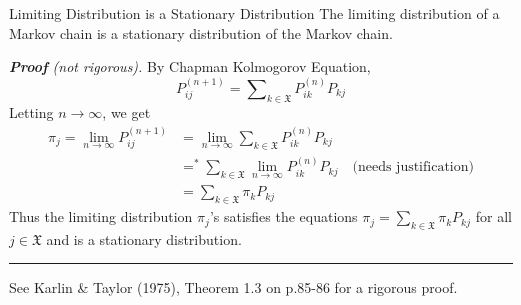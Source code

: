 \documentclass[letterpaper,handout]{beamer}
\def\P{\mathbb{P}}
\def\Sum{\sum\nolimits}
\def\X{\mathfrak{X}}
\begin{document}
%
%
%

\begin{frame}{Limiting Distribution is a Stationary Distribution}
The limiting distribution of a Markov chain is a stationary distribution of the Markov chain.\medskip

{\em \textbf{Proof} (not rigorous).} By Chapman Kolmogorov Equation,
$$P^{(n+1)}_{ij}=\Sum_{k\in\X}P^{(n)}_{ik}P_{kj}$$
Letting $n\to\infty$, we get
\begin{align*}
\pi_j=\lim_{n\to\infty}P^{(n+1)}_{ij}&=\lim_{n\to\infty}\Sum_{k\in\X}P^{(n)}_{ik}P_{kj}\\
&=^*\Sum_{k\in\X}\lim_{n\to\infty}P^{(n)}_{ik}P_{kj} \quad\text{(needs justification)}\\
&=\Sum_{k\in\X}\pi_kP_{kj}
\end{align*}
Thus the limiting distribution $\pi_j$'s satisfies the equations $\pi_j=\Sum_{k\in\X}\pi_kP_{kj}$ for all $j\in\X$
and is a stationary distribution.\smallskip
\hrule\smallskip

{\footnotesize See Karlin \& Taylor (1975), Theorem 1.3 on p.85-86 for a rigorous proof.}
\end{frame}
%
\end{document}
